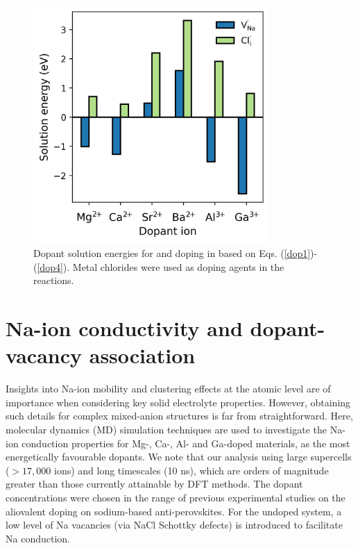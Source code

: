 \documentclass[12pt]{report}
\begin{document}
\begin{figure}[H]
\centering
\includegraphics[width=9cm]{./figures/doping.jpg}
\caption{Dopant solution energies for  and  doping in  based on Eqs. (\ref{dop1})-(\ref{dop4}). Metal chlorides were used as doping agents in the reactions.}
\label{doping}
\end{figure}

\section{Na-ion conductivity and dopant-vacancy association}

Insights into Na-ion mobility and clustering effects at the atomic level are of importance when considering key solid electrolyte properties. 
However, obtaining such details for complex mixed-anion structures is far from straightforward. 
Here, molecular dynamics (MD) simulation techniques are used to investigate the Na-ion conduction properties for Mg-, Ca-, Al- and Ga-doped materials, as the most energetically favourable dopants. 
We note that our analysis using large supercells ($>17,000$ ions) and long timescales (10 ns), which are orders of magnitude greater than those currently attainable by DFT methods. 
The dopant concentrations were chosen in the range of previous experimental studies on the aliovalent doping on sodium-based anti-perovskites.\cite{wang2015a, fan2020} For the undoped system, a low level of Na vacancies (via NaCl Schottky defects) is introduced to facilitate Na conduction.
\end{document}
